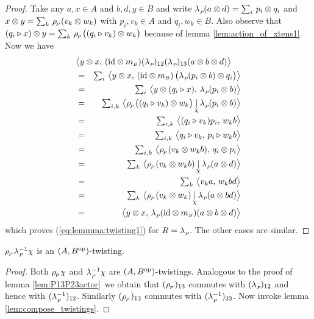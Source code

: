 \begin{proof}
Take any $a,x\in A$ and $b,d,y\in B$ and write
$\lambda_{_P\!}(a \otimes d) = \sum_i \, p_i \otimes q_i$ and $x \otimes y = \sum_k \, \rho_{_{\!P}}(v_k \otimes w_k)$
with $p_i, v_k \in A$ and $q_i, w_k \in B$. Also observe that
$(q_i \lact x) \tens y = \sum_k \, \rp\!\left((q_i \lact v_k) \tens w_k\vertM\right)$
because of lemma \ref{lem:action_of_xtens1}\@. Now we have
\begin{eqnarray*}
\lefteqn{
  \pairM{y \tens x}{(\id \tens \mult{B}) (\lp)_{12} (\lp)_{13} (a \tens b \tens d)}} \\
&=&
      \textstyle \sum_i \,
      \pairM{y \tens x}{(\id \tens \mult{B}) \left( \lp(p_i \tens b) \tens q_i \vertM\right)}
\\&=&
      \textstyle \sum_i \,
      \pairM{y \tens (q_i \lact x)}{\lp(p_i \tens b)}
\\&=&
      \textstyle \sum_{i,k} \,
      \pairflipM{\rp\!\left((q_i \lact v_k) \tens w_k\vertM\right)}{\lp(p_i \tens b)}
\\&=&
      \textstyle \sum_{i,k} \, \pairM{(q_i \lact v_k) p_i}{w_k b}
\\&=&
      \textstyle \sum_{i,k} \, \pairM{q_i \lact v_k}{p_i \lact w_k b}
\\&=&
      \textstyle \sum_{i,k} \, \pairM{\rp(v_k \tens w_k b)}{q_i \tens p_i}
\\&=&
      \textstyle \sum_{k} \, \pairflipM{\rp(v_k \tens w_k b)}{\lp(a \tens d)}
\\&=&
      \textstyle \sum_{k} \, \pairM{v_k a}{w_k b d}
\\&=&
      \textstyle \sum_{k} \, \pairflipM{\rp(v_k \tens w_k)}{\lp(a \tens b d)}
\\&=&
      \pairM{y \tens x}{\lp(\id \tens \mult{B})(a \tens b \tens d)}
\end{eqnarray*}
which proves (\ref{eq:lemmma:twisting1}) for $R=\lambda_{_P\!}$. The other cases are similar.
\end{proof}


\begin{cor_sec} \label{cor:twist_map_QD} \hspace{0.5em}
$\rho_{_{\!P}}\lambda_{_P\!}^{-1}\chi$ is an\/ $(A,B^{\rm op})$-twisting.
\end{cor_sec}
\begin{proof}
Both $\rho_{_{\!P}}\chi$ and $\lambda_{_P\!}^{-1}\chi$ are $(A,B^{\rm op})$-twistings.
Analogous to the proof of lemma \ref{lem:P13P23actor}\ we obtain
that $(\rho_{_{\!P}})_{13}$ commutes with $(\lambda_{_P\!})_{12}$ and hence with $(\lambda_{_P\!}^{-1})_{12}$.
Similarly $(\rho_{_{\!P}})_{13}$ commutes with $(\lambda_{_P\!}^{-1})_{23}$.
Now invoke lemma \ref{lem:compose_twistings}.
\end{proof}


